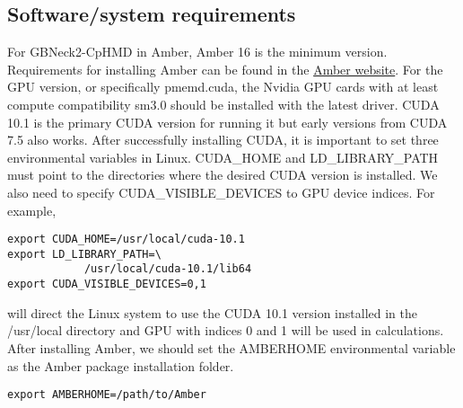 \documentclass[9pt,tutorial]{livecoms}
\begin{document}
\subsection{Software/system requirements} %
For GBNeck2-CpHMD in Amber, Amber 16 is the minimum version. Requirements for installing Amber can be found in the \href{https://ambermd.org/Installation.php}{Amber website}. For the GPU version, or specifically pmemd.cuda, the Nvidia GPU cards with at least compute compatibility sm3.0 should be installed with the latest driver. CUDA 10.1 is the primary CUDA version for running it but early versions from CUDA 7.5 also works. After successfully installing CUDA, it is important to set three environmental variables in Linux. CUDA\_HOME and LD\_LIBRARY\_PATH must point to the directories where the desired CUDA version is installed. We also need to specify CUDA\_VISIBLE\_DEVICES to GPU device indices. For example, 
\begin{lstlisting}
export CUDA_HOME=/usr/local/cuda-10.1
export LD_LIBRARY_PATH=\
            /usr/local/cuda-10.1/lib64
export CUDA_VISIBLE_DEVICES=0,1
\end{lstlisting}
will direct the Linux system to use the CUDA 10.1 version installed in the /usr/local directory and GPU with indices 0 and 1 will be used in calculations. After installing Amber, we should set the AMBERHOME environmental variable as the Amber package installation folder. 
\begin{lstlisting}
export AMBERHOME=/path/to/Amber
\end{lstlisting}
\end{document}
